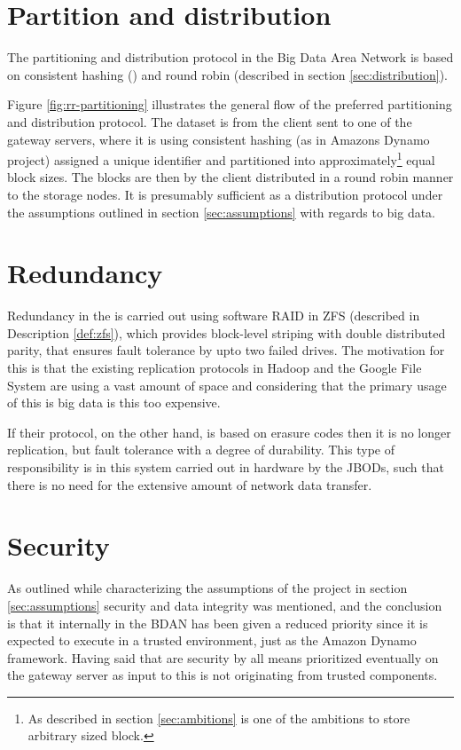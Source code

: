 \section{Partition and distribution}
The partitioning and distribution protocol in the Big Data Area Network is based on consistent hashing () and round robin (described in section \ref{sec:distribution}).


Figure \ref{fig:rr-partitioning} illustrates the general flow of the preferred partitioning and distribution protocol. The dataset is from the client sent to one of the gateway servers, where it is using consistent hashing (as in Amazons Dynamo project) assigned a unique identifier and partitioned into approximately\footnote{As described in section \ref{sec:ambitions} is one of the ambitions to store arbitrary sized block.} equal block sizes. The blocks are then by the client distributed in a round robin manner to the storage nodes. It is presumably sufficient as a distribution protocol  under the assumptions outlined in section \ref{sec:assumptions} with regards to big data.


\section{Redundancy}
Redundancy in the \Network is carried out using \eg software RAID in ZFS (described in Description \ref{def:zfs}), which provides block-level striping with double distributed parity, that ensures fault tolerance by upto two failed drives. The motivation for this is that the existing replication protocols in \eg Hadoop and the Google File System are using a vast amount of space and considering that the primary usage of this is big data is this too expensive. 
\newline

If their protocol, on the other hand, is based on erasure codes then it is no longer replication, but fault tolerance with a degree of durability. This type of responsibility is in this system carried out in hardware by the JBODs, such that there is no need for the extensive amount of network data transfer.

\section{Security}
As outlined while characterizing the assumptions of the project in section \ref{sec:assumptions} security and data integrity was mentioned, and the conclusion is that it internally in the BDAN has been given a reduced priority since it is expected to execute in a trusted environment, just as the Amazon Dynamo framework. Having said that are security by all means prioritized eventually on the gateway server as input to this is not originating from trusted components.
